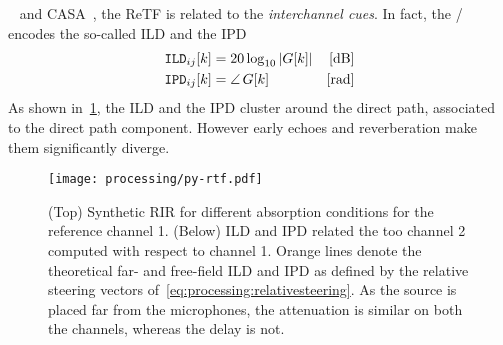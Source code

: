 

~ and \ac{CASA}~, the \ac{ReTF} is related to the \textit{interchannel cues}.
In fact, the \ReTFs/ encodes the so-called \ac{ILD} and the \ac{IPD}
\begin{equation}
    \begin{aligned}
        \ild_{\idxMicSrc}[k] &= 20 \log_{10} \magnitudeOf{G[k]} & [\si{\dB}]\\
        \ipd_{\idxMicSrc}[k] &= \phaseOf{G[k]} \mathspace       & [\si{\radian}]
    \end{aligned}
\end{equation}
As shown in~\cref{fig:processing:ildipd}, the \ac{ILD} and the \ac{IPD} cluster around the direct path, associated to the direct path component.
However early echoes and reverberation make them significantly diverge.

\begin{figure}[]
    \begin{fullwidth}
        \texttt{[image: processing/py-rtf.pdf]}
        \caption{
            (Top) Synthetic \ac{RIR} for different absorption conditions for the reference channel 1.
            (Below) \ac{ILD} and \ac{IPD} related the too channel 2 computed with respect to channel 1.
            Orange lines denote the theoretical far- and free-field \ac{ILD} and \ac{IPD} as defined by the relative steering vectors of~\cref{eq:processing:relativesteering}.
            As the source is placed far from the microphones, the attenuation is similar on both the channels, whereas the delay is not.
        }\label{fig:processing:ildipd}
    \end{fullwidth}
\end{figure}



